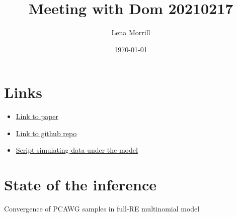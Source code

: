 \documentclass{article}
\title{Meeting with Dom 20210217}
\author{Lena Morrill}
\date{\today}
\begin{document}
\maketitle

\section{Links}

\begin{itemize}
\item \href{https://www.overleaf.com/project/5e6fb59b1abb040001d1352b}{Link to paper}
\item \href{https://github.com/lm687/Global_Differential_Abundance_Pipeline}{Link to github repo}
\item \href{https://github.com/lm687/Global_Differential_Abundance_Pipeline/blob/master/code/3_analysis/simulation_model_assessment/generate_datasets_simulations/GenerationCnorm.R}{Script simulating data under the model}
\end{itemize}

\section{State of the inference}
Convergence of PCAWG samples in full-RE multinomial model
\end{document}

